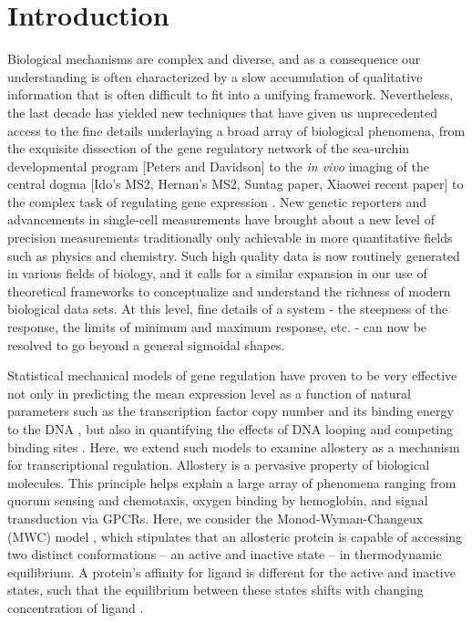 \section*{Introduction}

Biological mechanisms are complex and diverse, and as a consequence our
understanding is often characterized by a slow accumulation of qualitative
information that is often difficult to fit into a unifying framework.
Nevertheless, the last decade has yielded new techniques that have given us
unprecedented access to the fine details underlaying a broad array of
biological phenomena, from the exquisite dissection of the gene regulatory
network of the sea-urchin developmental program [Peters and Davidson] to the
\textit{in vivo} imaging of the central dogma [Ido's MS2, Hernan's MS2, Suntag
paper, Xiaowei recent paper] to the complex task of regulating gene expression
\cite{Garcia2011}. New genetic reporters and advancements in single-cell
measurements have brought about a new level of precision measurements
traditionally only achievable in more quantitative fields such as physics and
chemistry. Such high quality data is now routinely generated in various fields
of biology, and it calls for a similar expansion in our use of theoretical
frameworks to conceptualize and understand the richness of modern biological
data sets. At this level, fine details of a system - the steepness of the
response, the limits of minimum and maximum response, etc. - can now be
resolved to go beyond a general sigmoidal shapes.

Statistical mechanical models of gene regulation have proven to be very
effective not only in predicting the mean expression level as a function of
natural parameters such as the transcription factor copy number and its binding
energy to the DNA \cite{Garcia2011}, but also in quantifying the effects of DNA
looping \cite{Boedicker2013a} and competing binding sites \cite{Brewster2014}.
Here, we extend such models to examine allostery as a mechanism for
transcriptional regulation. Allostery is a pervasive property of biological
molecules. This principle helps explain a large array of phenomena ranging from
quorum sensing and chemotaxis, oxygen binding by hemoglobin, and signal
transduction via GPCRs. Here, we consider the Monod-Wyman-Changeux (MWC) model
\cite{MONOD1965}, which stipulates that an allosteric protein is capable of
accessing two distinct conformations -- an active and
inactive state -- in thermodynamic equilibrium. A protein's affinity
for ligand is different for the active and inactive states, such that the
equilibrium between these states shifts with changing concentration of ligand
\cite{Marzen2013}.

